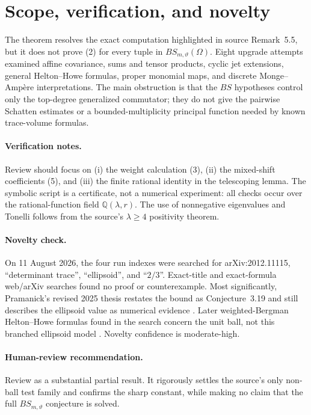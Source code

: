 \documentclass[11pt]{article}
\begin{document}
\section{Scope, verification, and novelty}

The theorem resolves the exact computation highlighted in source
Remark~5.5, but it does not prove (2) for every tuple in
$BS_{m,\vartheta}(\Omega)$.  Eight upgrade attempts examined affine
covariance, sums and tensor products, cyclic jet extensions, general
Helton--Howe formulas, proper monomial maps, and discrete Monge--Amp\`ere
interpretations.  The main obstruction is that the $BS$ hypotheses control
only the top-degree generalized commutator; they do not give the pairwise
Schatten estimates or a bounded-multiplicity principal function needed by
known trace-volume formulas.

\paragraph{Verification notes.}
Review should focus on (i) the weight calculation (3), (ii) the mixed-shift
coefficients (5), and (iii) the finite rational identity in the telescoping
lemma.  The symbolic script is a certificate, not a numerical experiment:
all checks occur over the rational-function field $\mathbb Q(\lambda,r)$.
The use of nonnegative eigenvalues and Tonelli follows from the source's
$\lambda\ge4$ positivity theorem.

\paragraph{Novelty check.}
On 11 August 2026, the four run indexes were searched for arXiv:2012.11115,
``determinant trace'', ``ellipsoid'', and ``$2/3$''.  Exact-title and
exact-formula web/arXiv searches found no proof or counterexample.  Most
significantly, Pramanick's revised 2025 thesis restates the bound as
Conjecture~3.19 and still describes the ellipsoid value as numerical evidence
\cite{Pramanick}.  Later weighted-Bergman Helton--Howe formulas found in the
search concern the unit ball, not this branched ellipsoid model
\cite{TWZ}.  Novelty confidence is moderate-high.

\paragraph{Human-review recommendation.}
Review as a substantial partial result.  It rigorously settles the source's
only non-ball test family and confirms the sharp constant, while making no
claim that the full $BS_{m,\vartheta}$ conjecture is solved.
\end{document}
